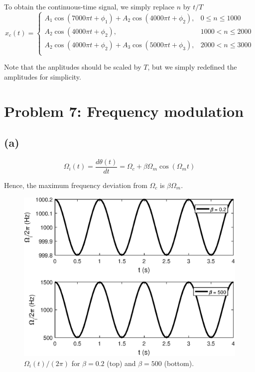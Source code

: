 \documentclass{article}
\begin{document}
\begin{description}
	To obtain the continuous-time signal, we simply replace $n$ by $t/T$
	\begin{equation}
		x_c(t) = \begin{cases}
		A_1\cos(7000\pi t + \phi_1) + A_2\cos(4000\pi t + \phi_2), & 0 \leq n \leq 1000 \\
		A_2\cos(4000\pi t + \phi_2), & 1000 < n \leq 2000 \\
		A_2\cos(4000\pi t + \phi_2) + A_3\cos(5000\pi t + \phi_3), & 2000 < n \leq 3000 \\
		\end{cases}
	\end{equation}
	
	Note that the anplitudes should be scaled by $T$, but we simply redefined the amplitudes for simplicity. 
	
\end{description}

\section{Problem 7: Frequency modulation}

\subsection{(a)}

\begin{equation}
	\Omega_i(t) = \dfrac{d\theta(t)}{dt} = \Omega_c + \beta\Omega_m\cos(\Omega_mt)
\end{equation}

Hence, the maximum frequency deviation from $\Omega_c$ is $\beta\Omega_m$.

\FloatBarrier
\begin{figure}[h!]
	\centering
	\includegraphics[scale=0.8]{hw6_fm_a.eps}
	\caption{$\Omega_i(t)/(2\pi)$ for $\beta = 0.2$ (top) and $\beta = 500$ (bottom).}
\end{figure}
\FloatBarrier
\end{document}
